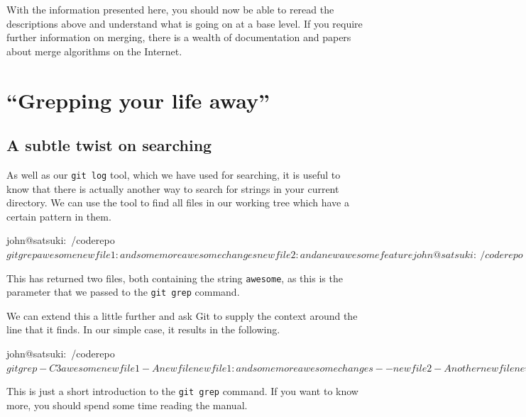 With the information presented here, you should now be able to reread the descriptions above and understand what is going on at a base level.
If you require further information on merging, there is a wealth of documentation and papers about merge algorithms on the Internet.

\section{``Grepping your life away''}
\subsection{A subtle twist on searching}

As well as our \texttt{git log} tool, which we have used for searching, it is useful to know that there is actually another way to search for strings in your current directory.
We can use the  tool to find all files in our working tree which have a certain pattern in them.

\begin{code}
john@satsuki:~/coderepo$ git grep awesome
newfile1:and some more awesome changes
newfile2:and a new awesome feature
john@satsuki:~/coderepo$
\end{code}

This has returned two files, both containing the string \texttt{awesome}, as this is the parameter that we passed to the \texttt{git grep} command.

We can extend this a little further and ask Git to supply the context around the line that it finds.
In our simple case, it results in the following.

\begin{code}
john@satsuki:~/coderepo$ git grep -C3 awesome
newfile1-A new file
newfile1:and some more awesome changes
--
newfile2-Another new file
newfile2:and a new awesome feature
john@satsuki:~/coderepo$
\end{code}

This is just a short introduction to the \texttt{git grep} command.
If you want to know more, you should spend some time reading the manual.
